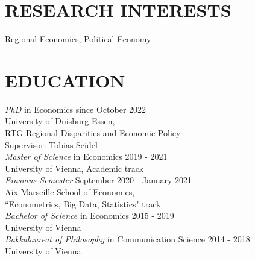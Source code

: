 \documentclass[margin, 12pt]{res} %
\begin{document}
	\begin{resume}
		
		
		\section{RESEARCH INTERESTS}
		Regional Economics, Political Economy
		\hspace{.1cm}
		
		\section{EDUCATION}
		
		{\sl PhD} in Economics \hfill since October 2022 \\
		University of Duisburg-Essen, \\
		RTG Regional Disparities and Economic Policy \\
		Supervisor: Tobias Seidel \vspace{0.2cm}\\
		{\sl Master of Science} in Economics \hfill 2019 - 2021 \\
		University of Vienna, Academic track \vspace{0.2cm}\\
		{\sl Erasmus Semester} \hfill September 2020 - January 2021 \\
		Aix-Marseille School of Economics, \\
		``Econometrics, Big Data, Statistics" track \vspace{0.2cm}\\
		{\sl Bachelor of Science} in Economics \hfill 2015 - 2019 \\
		University of Vienna \vspace{0.2cm}\\
		{\sl Bakkalaureat of Philosophy} in Communication Science \hfill 2014 - 2018 \\
		University of Vienna

		

\end{resume}
\end{document}
